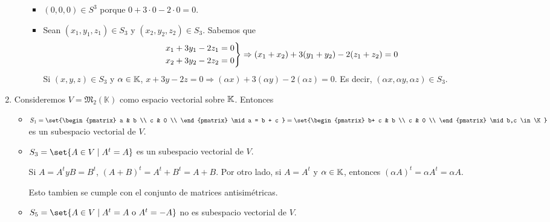 \begin{example}
\begin{enumerate}
\begin{itemize}
			            \begin{itemize}
				            \item \((0,0,0) \in S^{3 } \) porque \(0 + 3 \cdot 0 - 2 \cdot 0 = 0 \).
				            \item Sean \((x_1,y_1,z_1) \in S_3 \) y \((x_2,y_2,z_2) \in S_3 \). Sabemos que
				                  \[
					                  \begin{rcases}
						                  x_{1} + 3y_1 -2z_1 = 0 \\
						                  x_2 + 3y_2 - 2z_2 = 0
					                  \end{rcases} \Rightarrow (x_1 + x_2) + 3(y_1 + y_2) - 2(z_1 + z_2) = 0
				                  \]
				                  Si \((x,y,z) \in S_3\) y \(\alpha \in \mathbb{K} \), \(x + 3y - 2z = 0 \Rightarrow (\alpha x) + 3(\alpha y ) - 2(\alpha z) = 0 \). Es decir, \((\alpha x, \alpha y, \alpha z ) \in S_3\).
			            \end{itemize}
		      \end{itemize}
		\item Consideremos \(V = \mathfrak{M}_{2}(\mathbb{K}) \) como espacio vectorial sobre \(\mathbb{K} \). Entonces
		      \begin{itemize}
			      \item \(S_1 = \set{\begin{pmatrix}
					            a & b \\
					            c & 0 \\
				            \end{pmatrix} \mid a = b + c } = \set{\begin{pmatrix}
					            b+ c & b \\
					            c    & 0 \\
				            \end{pmatrix} \mid b,c \in \K}\) es un subespacio vectorial de \(V \).

			      \item \(S_3 = \set{A \in V \mid A^{t} = A}\) es un subespacio vectorial de \(V \).

			            Si \(A = A^{t} y B = B^{t}\), \((A+B)^{t} = A^{t} + B^{t} = A + B   \).
			            Por otro lado, si \(A = A^{t } \) y \(\alpha \in \mathbb{K}\), entonces \((\alpha A)^{t} = \alpha A^{t} = \alpha A \).

			            Esto tambien se cumple con el conjunto de matrices antisimétricas.

			      \item \(S_5 = \set{A \in V \mid A^{t} = A \text{ o } A^{t} = -A  }\) no es subespacio vectorial de \(V \).


\end{itemize}
\end{enumerate}
\end{example}
